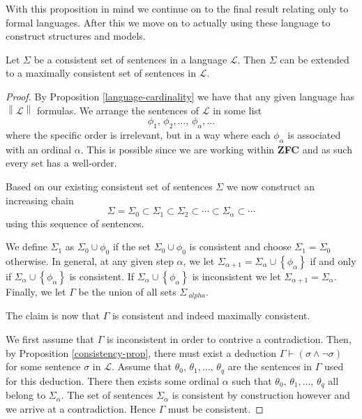 \documentclass[../../main.tex]{subfiles}
\begin{document}
With this proposition in mind we continue on to the final result relating only to formal languages.
After this we move on to actually using these language to construct structures and models.

\begin{theorem}\cite[Proposition 1.3.11]{Cha90}
    Let $\Sigma$ be a consistent set of sentences in a language $\mathcal{L}$.
    Then $\Sigma$ can be extended to a maximally consistent set of sentences in $\mathcal{L}$.
\end{theorem}

\begin{proof}\cite[Lemma 1.2.9]{Cha90}  
    By Proposition \ref{language-cardinality} we have that any given language has $\left\lVert \mathcal{L}\right\rVert$ formulas.
    We arrange the sentences of $\mathcal{L}$ in some list
    $$\phi_1,\, \phi_2,\ldots,\, \phi_{\alpha},\ldots$$
    where the specific order is irrelevant, but in a way where each $\phi_{\alpha}$ is associated with an ordinal $\alpha$.
    This is possible since we are working within \textbf{ZFC} and as such every set has a well-order.

    Based on our existing consistent set of sentences $\Sigma$ we now construct an increasing chain
    $$\Sigma = \Sigma_0 \subset \Sigma_1 \subset \Sigma_2 \subset \cdots \subset \Sigma_{\alpha} \subset \cdots$$
    using this sequence of sentences.
    
    We define $\Sigma_1$ as $\Sigma_0 \cup \phi_0$ if the set $\Sigma_0 \cup \phi_0$ is consistent and choose $\Sigma_1 = \Sigma_0$ otherwise.
    In general, at any given step $\alpha$, we let $\Sigma_{\alpha + 1} = \Sigma_{\alpha} \cup \left\{\phi_{\alpha}\right\}$
    if and only if $\Sigma_{\alpha} \cup \left\{\phi_{\alpha}\right\}$ is consistent.
    If $\Sigma_{\alpha} \cup \left\{\phi_{\alpha}\right\}$ is inconsistent we let $\Sigma_{\alpha + 1} = \Sigma_{\alpha}$.
    Finally, we let $\Gamma$ be the union of all sets $\Sigma_{\  alpha}$.

    The claim is now that $\Gamma$ is consistent and indeed maximally consistent.

    We first assume that $\Gamma$ is inconsistent in order to contrive a contradiction.
    Then, by Proposition \ref{consistency-prop}, there must exist a deduction $\Gamma \vdash \left(\sigma \wedge \lnot\sigma\right)$ for some sentence $\sigma$ in $\mathcal{L}$.
    Assume that $\theta_0,\, \theta_1, \ldots,\, \theta_q$ are the sentences in $\Gamma$ used for this deduction.
    There then exists some ordinal $\alpha$ such that $\theta_0,\, \theta_1, \ldots,\, \theta_q$ all belong to $\Sigma_{\alpha}$.
    The set of sentences $\Sigma_{\alpha}$ is consistent by construction however and we arrive at a contradiction.
    Hence $\Gamma$ must be consistent.


\end{proof}
\end{document}
